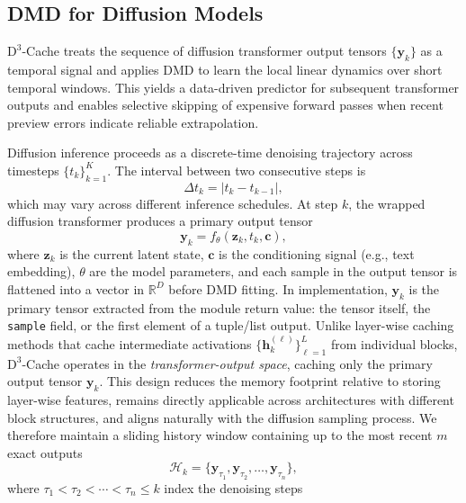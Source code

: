 \subsection{DMD for Diffusion Models}\label{sub:method:dmd-cache}
$\mathrm{D}^3$-Cache treats the sequence of diffusion transformer output tensors $\{\mathbf{y}_k\}$
as a temporal signal
and applies DMD to learn the local linear dynamics
over short temporal windows.
This yields a data-driven predictor
for subsequent transformer outputs
and enables selective skipping of expensive forward passes
when recent preview errors indicate reliable extrapolation.

Diffusion inference proceeds as a discrete-time denoising trajectory
across timesteps $\{t_k\}_{k=1}^K$.
The interval between two consecutive steps is
\begin{equation}
\Delta t_k = |t_k - t_{k-1}|,
\label{eq:method:dt}
\end{equation}
which may vary across different inference schedules.
At step $k$,
the wrapped diffusion transformer produces a primary output tensor
\begin{equation}
\mathbf{y}_k = f_\theta(\mathbf{z}_k, t_k, \mathbf{c}),
\label{eq:method:prelim:diffusion}
\end{equation}
where $\mathbf{z}_k$ is the current latent state,
$\mathbf{c}$ is the conditioning signal (e.g., text embedding),
$\theta$ are the model parameters,
and each sample in the output tensor is flattened into a vector in $\mathbb{R}^D$
before DMD fitting.
In implementation,
$\mathbf{y}_k$ is the primary tensor extracted from the module return value:
the tensor itself,
the \texttt{sample} field,
or the first element of a tuple/list output.
Unlike layer-wise caching methods that cache intermediate activations
$\{\mathbf{h}_k^{(\ell)}\}_{\ell=1}^{L}$ from individual blocks,
$\mathrm{D}^3$-Cache operates in the \emph{transformer-output space},
caching only the primary output tensor $\mathbf{y}_k$.
This design reduces the memory footprint relative to storing layer-wise features,
remains directly applicable across architectures with different block structures,
and aligns naturally with the diffusion sampling process.
We therefore maintain a sliding history window
containing up to the most recent $m$ exact outputs
\begin{equation}
\mathcal{H}_k = \{\mathbf{y}_{\tau_1}, \mathbf{y}_{\tau_2}, \ldots, \mathbf{y}_{\tau_n}\},
\label{eq:method:history}
\end{equation}
where $\tau_1 < \tau_2 < \cdots < \tau_n \le k$ index the denoising steps
